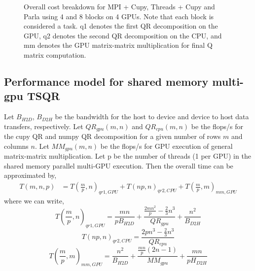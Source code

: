 \documentclass{article}
\begin{document}
\begin{figure}[!tbhp]
    \caption{Overall cost breakdown for MPI + Cupy, Threads + Cupy and Parla using 4 and 8 blocks on 4 GPUs. Note that each block is considered a task. q1 denotes the first QR decomposition on the GPU, q2 denotes the second QR decomposition on the CPU, and mm denotes the GPU matrix-matrix multiplication for final Q matrix computation. \label{fig:parla_breakdown} }
\end{figure}



\subsection{Performance model for shared memory multi-gpu TSQR}
Let $B_{H2D}$, $B_{D2H}$ be the bandwidth for the host to device and device to host data transfers, respectively. Let $QR_{gpu}(m,n)$ and $QR_{cpu}(m,n)$ be the flops/s for the cupy QR and numpy QR decomposition for a given number of rows $m$ and columns $n$. Let $MM_{gpu}(m,n)$ be the flops/s for GPU execution of general matrix-matrix multiplication. Let p be the number of threads (1 per GPU) in the shared memory parallel multi-GPU execution. Then the overall time can be approximated by, 
\begin{align}
    T(m,n,p) &= T(\frac{m}{p}, n)_{qr1,GPU}  + T(np,n)_{qr2,CPU} + T(\frac{m}{p},m)_{mm,GPU} \label{eq:qr_sm}
\end{align} where we can write, 
\begin{equation}
    T(\frac{m}{p}, n)_{qr1,GPU} = \frac{mn}{pB_{H2D}} + \frac{\frac{2mn^2}{p} -\frac{2}{3}n^3}{QR_{gpu}} + \frac{n^2}{B_{D2H}} \label{eq:qr1_sm}
\end{equation}
\begin{equation}
    T(np,n)_{qr2,CPU} = \frac{2pn^3 -\frac{2}{3}n^3}{QR_{cpu}} \label{eq:qr2_sm}
\end{equation}
\begin{equation}
    T(\frac{m}{p},m)_{mm,GPU} = \frac{n^2}{B_{H2D}} + \frac{\frac{mn}{p}(2n-1)}{MM_{gpu}} + \frac{mn}{pH_{D2H}} \label{eq:mm_sm}
\end{equation}
\end{document}
